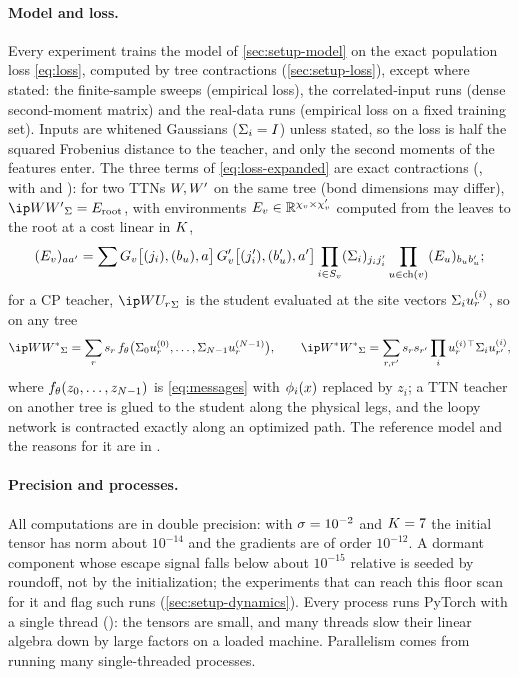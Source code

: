 \paragraph{Model and loss.}
Every experiment trains the model of \cref{sec:setup-model} on the exact population loss
\eqref{eq:loss}, computed by tree contractions (\cref{sec:setup-loss}), except where stated: the
finite-sample sweeps (empirical loss), the correlated-input runs (dense second-moment matrix) and the
real-data runs (empirical loss on a fixed training set). Inputs are whitened Gaussians ($\Sigma_{i}=I$)
unless stated, so the loss is half the squared Frobenius distance to the teacher, and only the second
moments of the features enter. The three terms of \eqref{eq:loss-expanded} are exact contractions
(, with  and ): for two TTNs $W,W'$ on the
same tree (bond dimensions may differ), $\ipS{\W}{\W'}=E_{\vroot}$, with environments
$E_v\in\mathbb{R}^{\chi_{v}\times\chi_{v}'}$ computed from the leaves to the root at a cost linear in $K$,
\begin{equation}\label{eq:environment}
  (E_v)_{aa'}=\sum G_{v}\big[(j_i),(b_u),a\big]\,G_{v}'\big[(j'_i),(b'_u),a'\big]
  \prod_{i\in S_{v}}(\Sigma_{i})_{j_ij'_i}\prod_{u\in\mathrm{ch}(v)}(E_u)_{b_ub'_u};
\end{equation}
for a CP teacher, $\ipS{\W}{\U{r}}$ is the student evaluated at the site vectors $\Sigma_{i}u_{r}^{(i)}$, so on any
tree
\begin{equation}\label{eq:cp-inner}
  \ipS{\W}{\Wt}=\sum_r\tw{r}\,f_\params\big(\Sigi{0}\fac{r}{0},\dots,\Sigi{\Ns-1}\fac{r}{\Ns-1}\big),
  \qquad
  \ipS{\Wt}{\Wt}=\sum_{r,r'}\tw{r}\tw{r'}\prod_i\fac{r}{i}{}\T\Sigi{i}\fac{r'}{i},
\end{equation}
where $f_\theta(z_0,\dots,z_{N-1})$ is \eqref{eq:messages} with $\phi_{i}(x)$ replaced by $z_i$; a TTN teacher on
another tree is glued to the student along the physical legs, and the loopy network is contracted exactly
along an optimized path. The reference model and the reasons for it are in .

\paragraph{Precision and processes.}
All computations are in double precision: with $\sigma=10^{-2}$ and $K=7$ the initial tensor has norm
about $10^{-14}$ and the gradients are of order $10^{-12}$. A dormant component whose escape signal falls
below about $10^{-15}$ relative is seeded by roundoff, not by the initialization; the experiments that can
reach this floor scan for it and flag such runs (\cref{sec:setup-dynamics}). Every process runs PyTorch
with a single thread (): the tensors are small, and many threads slow
their linear algebra down by large factors on a loaded machine. Parallelism comes from running many
single-threaded processes.

